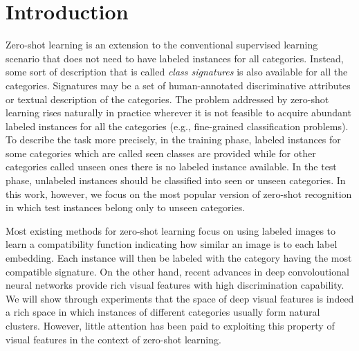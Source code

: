 \documentclass[10pt,twocolumn,letterpaper]{article}
\begin{document}
\section{Introduction}
Zero-shot learning is an extension to the conventional supervised learning scenario
that does not need to have labeled instances for all categories.
Instead, some sort of description that is called \textit{class signatures} is also available for all the categories.
Signatures may be a set of human-annotated discriminative attributes or textual description of the categories.
The problem addressed by zero-shot learning rises naturally in practice wherever it is not feasible to acquire abundant labeled instances for all the categories (e.g., fine-grained classification problems).
To describe the task more precisely, in the training phase, labeled instances for some categories which are called seen classes are provided
while for other categories called unseen ones there is no labeled instance available.
In the test phase, unlabeled instances should be classified into seen or unseen categories. In this work, however, we focus on the most popular version of zero-shot recognition in which test instances belong only to unseen categories.

Most existing methods for zero-shot learning focus on using labeled images to learn a compatibility function indicating how similar an image is
to each label embedding. Each instance will then be labeled with the category having the most compatible signature.
 On the other hand, recent advances in deep convoloutional neural networks provide rich visual features with high discrimination capability.
  We will show through experiments that the space of deep visual features is indeed a rich space in which instances of different categories usually form natural clusters. However, little attention has been paid to exploiting this property of visual features in the context of zero-shot learning.

\end{document}
